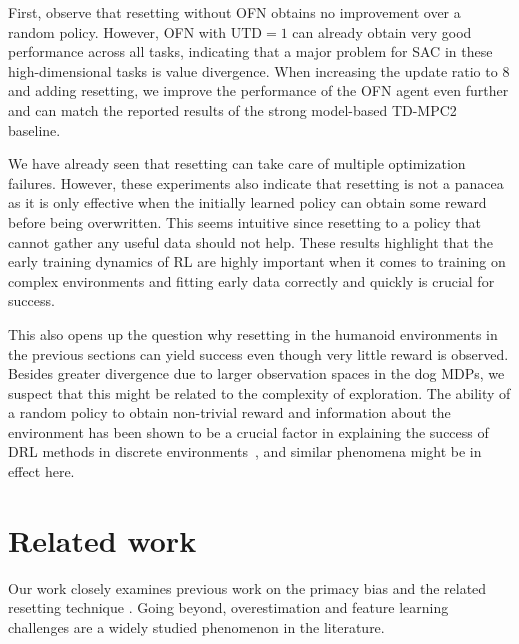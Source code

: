 First, observe that resetting without OFN obtains no improvement over a random policy. However, OFN with $\mathrm{UTD}=1$ can already obtain very good performance across all tasks, indicating that a major problem for SAC in these high-dimensional tasks is value divergence. When increasing the update ratio to $8$ and adding resetting, we improve the performance of the OFN agent even further and can match the reported results of the strong model-based TD-MPC2 baseline. 

We have already seen that resetting can take care of multiple optimization failures. However, these experiments also indicate that resetting is not a panacea as it is only effective when the initially learned policy can obtain some reward before being overwritten. 
This seems intuitive since resetting to a policy that cannot gather any useful data should not help. 
These results highlight that the early training dynamics of RL are highly important when it comes to training on complex environments and fitting early data correctly and quickly is crucial for success. 

This also opens up the question why resetting in the humanoid environments in the previous sections can yield success even though very little reward is observed. 
Besides greater divergence due to larger observation spaces in the dog MDPs, we suspect that this might be related to the complexity of exploration.
The ability of a random policy to obtain non-trivial reward and information about the environment has been shown to be a crucial factor in explaining the success of DRL methods in discrete environments~\parencite{laidlaw2023bridging}, and similar phenomena might be in effect here. 




\section{Related work}

Our work closely examines previous work on the primacy bias and the related resetting technique \parencite{anderson1992qlearning,nikishin2022primacy,doro2023barrier,schwarzer2023bigger}.
Going beyond, overestimation and feature learning challenges are a widely studied phenomenon in the literature.

